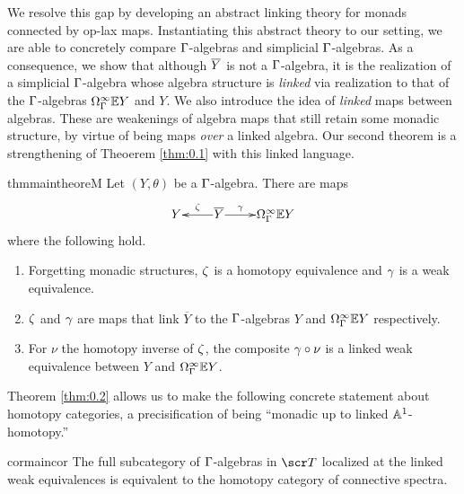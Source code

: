 \documentclass{amsart}
\theoremstyle{definition}
\begin{document}
We resolve this gap by developing an abstract linking theory for monads connected by op-lax maps. Instantiating this abstract theory to our setting, we are able to concretely compare $\Gamma$-algebras and simplicial $\Gamma$-algebras. As a consequence, we show that although $\overline{Y}$ is not a $\Gamma$-algebra, it is the realization of a simplicial $\Gamma$-algebra whose algebra structure is \emph{linked} via realization to that of the $\Gamma$-algebras $\Omega^{\infty}_{\Gamma} \mathbb{E} Y$ and $Y$. We also introduce the idea of \emph{linked} maps between algebras. These are weakenings of algebra maps that still retain some monadic structure,
by virtue of being maps \emph{over} a linked algebra. Our second theorem is a strengthening of Theoerem \ref{thm:0.1} with this linked language.

\begin{restatable}{thm}{maintheoreM}\label{thm:0.2}
Let $(Y,\theta)$ be a $\Gamma$-algebra. There are maps
\[
\xymatrix@1{
    Y &  \overline{Y} \ar[r]^-{\ga} \ar[l]_-{\ze} & \OM^{\infty}_{\GA} \bE Y 
}
\]
\noindent where the following hold.
\begin{enumerate}
    \item Forgetting monadic structures, $\zeta$ is a homotopy equivalence and $\gamma$ is a weak equivalence.
    \item $\zeta$ and $\gamma$ are maps that link $\overline{Y}$ to the $\Gamma$-algebras $Y$ and $\Omega^{\infty}_{\Gamma}\mathbb{E} Y$ respectively.
    \item For $\nu$ the homotopy inverse of $\zeta$, the composite $\gamma \circ \nu$ is a linked weak equivalence between $Y$ and $\Omega^{\infty}_{\Gamma} \mathbb{E} Y$.
\end{enumerate}
\end{restatable}

Theorem \ref{thm:0.2} allows us to make the following concrete statement about homotopy categories, a precisification of being ``monadic up to linked $\mathbb{A}^1$-homotopy.''

\begin{restatable}{cor}{maincor}\label{cor:0.3}
    The full subcategory of $\Gamma$-algebras in $\sT$ localized at the linked weak equivalences is equivalent to the homotopy category of connective spectra.
\end{restatable}

\end{document}
